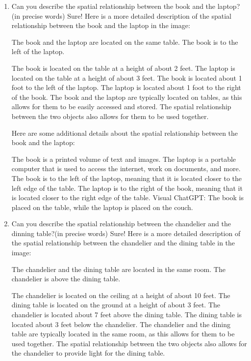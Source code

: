 \begin{enumerate}
    \item Can you describe the spatial relationship between the book and the laptop?(in precise words)
    \subitem 
    Sure! Here is a more detailed description of the spatial relationship between the book and the laptop in the image:
    
    The book and the laptop are located on the same table. The book is to the left of the laptop.
    
    The book is located on the table at a height of about 2 feet.
    The laptop is located on the table at a height of about 3 feet.
    The book is located about 1 foot to the left of the laptop.
    The laptop is located about 1 foot to the right of the book.
    The book and the laptop are typically located on tables, as this allows for them to be easily accessed and stored. The spatial relationship between the two objects also allows for them to be used together.
    
    Here are some additional details about the spatial relationship between the book and the laptop:
    
    The book is a printed volume of text and images.
    The laptop is a portable computer that is used to access the internet, work on documents, and more.
    The book is to the left of the laptop, meaning that it is located closer to the left edge of the table.
    The laptop is to the right of the book, meaning that it is located closer to the right edge of the table.
    \subitem Visual ChatGPT: The book is placed on the table, while the laptop is placed on the couch.
    \item Can you describe the spatial relationship between the chandelier and the dinning table?(in precise words)
    \subitem Sure! Here is a more detailed description of the spatial relationship between the chandelier and the dining table in the image:

    The chandelier and the dining table are located in the same room. The chandelier is above the dining table.
    
    The chandelier is located on the ceiling at a height of about 10 feet.
    The dining table is located on the ground at a height of about 3 feet.
    The chandelier is located about 7 feet above the dining table.
    The dining table is located about 3 feet below the chandelier.
    The chandelier and the dining table are typically located in the same room, as this allows for them to be used together. The spatial relationship between the two objects also allows for the chandelier to provide light for the dining table.
    

\end{enumerate}

